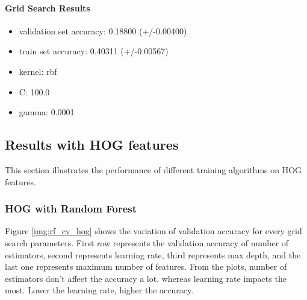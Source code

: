 \documentclass[12pt]{article}
\begin{document}
\paragraph{Grid Search Results}
\begin{itemize}
\item validation set accuracy: 0.18800 (+/-0.00400) 
\item train set accuracy: 0.40311 (+/-0.00567)
\item kernel: rbf
\item C: 100.0
\item gamma: 0.0001
\end{itemize}


\subsection{Results with HOG features}
This section illustrates the performance of different training algorithms on HOG features.

\subsubsection{HOG with Random Forest}
Figure \ref{img:rf_cv_hog} shows the variation of validation accuracy for every grid search parameters. First row represents the validation accuracy of number of estimators, second represents learning rate, third represents max depth, and the last one represents maximum number of features. From the plots, number of estimators don't affect the accuracy a lot, whereas learning rate impacts the most. Lower the learning rate, higher the accuracy.
\end{document}
